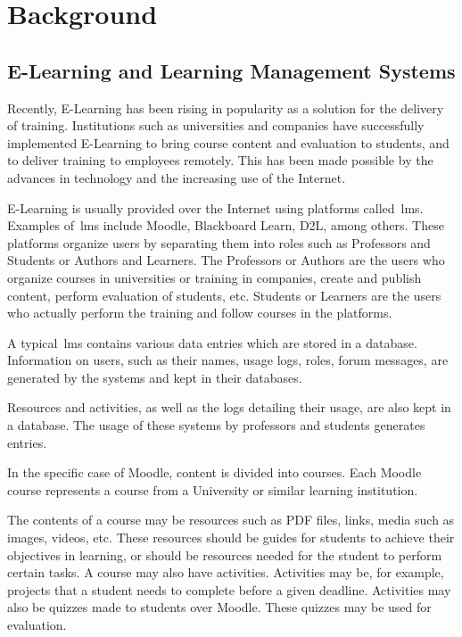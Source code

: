 \chapter{Background}
\label{sec:back}

\section{E-Learning and Learning Management Systems}
\label{sec:elearning_and_lms}

Recently, E-Learning has been rising in popularity as a solution for the
delivery of training. Institutions such as universities and companies have
successfully implemented E-Learning to bring course content and evaluation to
students, and to deliver training to employees remotely. This has been made
possible by the advances in technology and the increasing use of the Internet.

E-Learning is usually provided over the Internet using platforms
called~\gls{lms}. Examples of~\gls{lms} include Moodle, Blackboard Learn, D2L,
among others. These platforms organize users by separating them into roles such
as Professors and Students or Authors and Learners. The Professors or Authors
are the users who organize courses in universities or training in companies,
create and publish content, perform evaluation of students, etc. Students or
Learners are the users who actually perform the training and follow courses in
the platforms.

A typical~\gls{lms} contains various data entries which are stored in a
database. Information on users, such as their names, usage logs, roles, forum
messages, are generated by the systems and kept in their databases.

Resources and activities, as well as the logs detailing their usage, are also
kept in a database. The usage of these systems by professors and students
generates entries.~\cite{ind_010, ind_011, ind_013}

In the specific case of Moodle, content is divided into courses. Each Moodle
course represents a course from a University or similar learning institution.

The contents of a course may be resources such as PDF files, links, media such
as images, videos, etc. These resources should be guides for students to
achieve their objectives in learning, or should be resources needed for the
student to perform certain tasks. A course may also have activities. Activities
may be, for example, projects that a student needs to complete before a given
deadline.  Activities may also be quizzes made to students over Moodle. These
quizzes may be used for evaluation.

